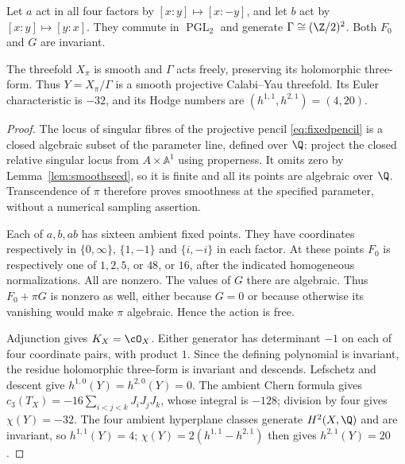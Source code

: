 Let $a$ act in all four factors by $[x:y]\mapsto[x:-y]$, and let $b$
act by $[x:y]\mapsto[y:x]$. They commute in $\operatorname{PGL}_2$ and
generate $\Gamma\cong(\Z/2)^2$. Both $F_0$ and $G$ are invariant.

\begin{theorem}\label{thm:fixedquotient}
The threefold $X_\pi$ is smooth and $\Gamma$ acts freely, preserving its
holomorphic three-form. Thus $Y=X_\pi/\Gamma$ is a smooth projective
Calabi--Yau threefold. Its Euler characteristic is $-32$, and its
Hodge numbers are $(h^{1,1},h^{2,1})=(4,20)$.
\end{theorem}
\begin{proof}
The locus of singular fibres of the projective pencil
\eqref{eq:fixedpencil} is a closed algebraic subset of the parameter line,
defined over $\Q$: project the closed relative singular locus from
$A\times\mathbb A^1$ using properness. It omits zero by
Lemma~\ref{lem:smoothseed}, so it is finite and all its points are
algebraic over $\Q$. Transcendence of $\pi$ therefore proves smoothness
at the specified parameter, without a numerical sampling assertion.

Each of $a,b,ab$ has sixteen ambient fixed points. They have coordinates
respectively in $\{0,\infty\}$, $\{1,-1\}$ and $\{i,-i\}$ in each
factor. At these points $F_0$ is respectively one of $1,2,5$, or $48$,
or $16$, after the indicated homogeneous normalizations. All are nonzero.
The values of $G$ there are algebraic. Thus $F_0+\pi G$ is nonzero as
well, either because $G=0$ or because otherwise its vanishing would make
$\pi$ algebraic. Hence the action is free.

Adjunction gives $K_X=\cO_X$. Either generator has determinant $-1$
on each of four coordinate pairs, with product $1$. Since the defining
polynomial is invariant, the residue holomorphic three-form is invariant
and descends. Lefschetz and descent give $h^{1,0}(Y)=h^{2,0}(Y)=0$.
The ambient Chern formula gives $c_3(T_X)=-16\sum_{i<j<k}J_iJ_jJ_k$,
whose integral is $-128$;
division by four gives $\chi(Y)=-32$. The four ambient hyperplane
classes generate $H^2(X,\Q)$ and are invariant, so $h^{1,1}(Y)=4$;
$\chi(Y)=2(h^{1,1}-h^{2,1})$ then gives $h^{2,1}(Y)=20$.
\end{proof}

